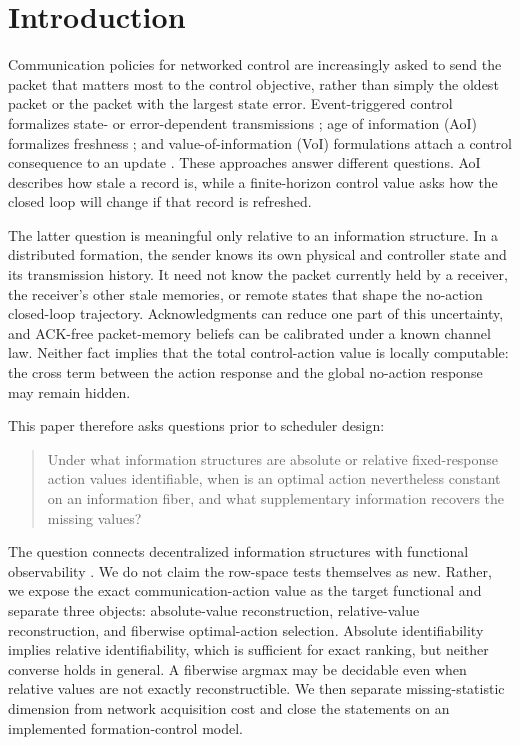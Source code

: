 \documentclass[10pt,twocolumn,twoside]{IEEEtran}
\begin{document}
\section{Introduction}

Communication policies for networked control are increasingly asked to send
the packet that matters most to the control objective, rather than simply the
oldest packet or the packet with the largest state error.  Event-triggered
control formalizes state- or error-dependent transmissions
\cite{tabuada2007event,dimarogonas2012distributed,wang2011eventtriggering};
age of information (AoI) formalizes freshness
\cite{yates2021aoisurvey,rajaraman2021notjustage}; and value-of-information
(VoI) formulations attach a control consequence to an update
\cite{soleymani2023voiglobal}.  These approaches answer different questions.
AoI describes how stale a record is, while a finite-horizon control value asks
how the closed loop will change if that record is refreshed.

The latter question is meaningful only relative to an information structure.
In a distributed formation, the sender knows its own physical and controller
state and its transmission history.  It need not know the packet currently
held by a receiver, the receiver's other stale memories, or remote states that
shape the no-action closed-loop trajectory.  Acknowledgments can reduce one
part of this uncertainty, and ACK-free packet-memory beliefs can be calibrated
under a known channel law.  Neither fact implies that the total control-action
value is locally computable: the cross term between the action response and
the global no-action response may remain hidden.

This paper therefore asks questions prior to scheduler design:

\begin{quote}
Under what information structures are absolute or relative fixed-response
action values identifiable, when is an optimal action nevertheless constant
on an information fiber, and what supplementary information recovers the
missing values?
\end{quote}

The question connects decentralized information structures
\cite{witsenhausen1971information,ho1972team,nayyar2013common} with functional
observability \cite{fernando2010functional,montanari2022functional}.  We do
not claim the row-space tests themselves as new.  Rather, we expose the exact
communication-action value as the target functional and separate three
objects: absolute-value reconstruction, relative-value reconstruction, and
fiberwise optimal-action selection.  Absolute identifiability implies relative
identifiability, which is sufficient for exact ranking, but neither converse
holds in general.  A fiberwise argmax may be decidable even when relative
values are not exactly reconstructible.  We then separate missing-statistic
dimension from network acquisition cost and close the statements on an
implemented formation-control model.
\end{document}
